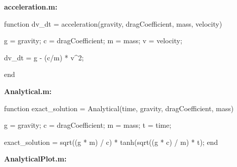 \documentclass[12pt]{article}
\begin{document}
\textbf{acceleration.m:}
\begin{verbatimtab}
function dv_dt = acceleration(gravity, dragCoefficient, mass, velocity)


    g = gravity;            %
    c = dragCoefficient;    %
    m = mass;               %
    v = velocity;           %
    
    dv_dt = g - (c/m) * v^2;

end
\end{verbatimtab}
\textbf{Analytical.m:}
\begin{verbatimtab}
function exact_solution = Analytical(time, gravity, dragCoefficient, mass)


    g = gravity;            %
    c = dragCoefficient;    %
    m = mass;               %
    t = time;               %
    
    exact_solution = sqrt((g * m) / c) * tanh(sqrt((g * c) / m) * t);
end
\end{verbatimtab}
\textbf{AnalyticalPlot.m:}
\end{document}

